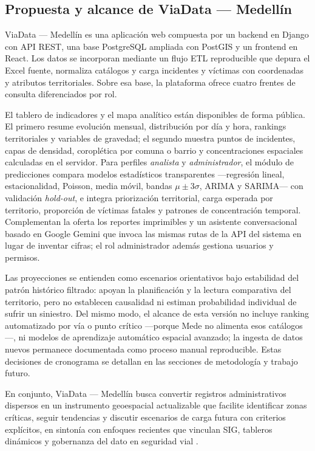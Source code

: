 \clearpage

\subsection{Propuesta y alcance de ViaData — Medellín}

ViaData — Medellín es una aplicación web compuesta por un backend en Django con API REST, una base PostgreSQL ampliada con PostGIS y un frontend en React. Los datos se incorporan mediante un flujo ETL reproducible que depura el Excel fuente, normaliza catálogos y carga incidentes y víctimas con coordenadas y atributos territoriales. Sobre esa base, la plataforma ofrece cuatro frentes de consulta diferenciados por rol.

El tablero de indicadores y el mapa analítico están disponibles de forma pública. El primero resume evolución mensual, distribución por día y hora, rankings territoriales y variables de gravedad; el segundo muestra puntos de incidentes, capas de densidad, coroplética por comuna o barrio y concentraciones espaciales calculadas en el servidor. Para perfiles \textit{analista} y \textit{administrador}, el módulo de predicciones compara modelos estadísticos transparentes ---regresión lineal, estacionalidad, Poisson, media móvil, bandas $\mu \pm 3\sigma$, ARIMA y SARIMA--- con validación \textit{hold-out}, e integra priorización territorial, carga esperada por territorio, proporción de víctimas fatales y patrones de concentración temporal. Complementan la oferta los reportes imprimibles y un asistente conversacional basado en Google Gemini que invoca las mismas rutas de la API del sistema en lugar de inventar cifras; el rol administrador además gestiona usuarios y permisos.

Las proyecciones se entienden como escenarios orientativos bajo estabilidad del patrón histórico filtrado: apoyan la planificación y la lectura comparativa del territorio, pero no establecen causalidad ni estiman probabilidad individual de sufrir un siniestro. Del mismo modo, el alcance de esta versión no incluye ranking automatizado por vía o punto crítico ---porque Mede no alimenta esos catálogos---, ni modelos de aprendizaje automático espacial avanzado; la ingesta de datos nuevos permanece documentada como proceso manual reproducible. Estas decisiones de cronograma se detallan en las secciones de metodología y trabajo futuro.

En conjunto, ViaData — Medellín busca convertir registros administrativos dispersos en un instrumento geoespacial actualizable que facilite identificar zonas críticas, seguir tendencias y discutir escenarios de carga futura con criterios explícitos, en sintonía con enfoques recientes que vinculan SIG, tableros dinámicos y gobernanza del dato en seguridad vial \cite{carrillo2024,lugo2025}.




